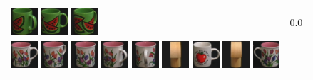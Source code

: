 {\begin{figure}[p]
\begin{tabular}{m{11cm} | m{3cm} |}
\includegraphics[width=1cm]{coil/beeld-34.eps}
\includegraphics[width=1cm]{coil/beeld-30.eps}
\includegraphics[width=1cm]{coil/beeld-33.eps}
& {\scriptsize 0.0}
\\
\includegraphics[width=1cm]{coil/beeld-6.eps}
\includegraphics[width=1cm]{coil/beeld-9.eps}
\includegraphics[width=1cm]{coil/beeld-8.eps}
\includegraphics[width=1cm]{coil/beeld-10.eps}
\includegraphics[width=1cm]{coil/beeld-11.eps}
\includegraphics[width=1cm]{coil/beeld-2.eps}
\includegraphics[width=1cm]{coil/beeld-36.eps}
\includegraphics[width=1cm]{coil/beeld-5.eps}
\includegraphics[width=1cm]{coil/beeld-7.eps}

\end{tabular}
\end{figure}}
